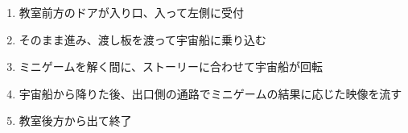 \documentclass[uplatex,dvipdfmx]{jsarticle}
\begin{document}
\begin{enumerate}
    \item 教室前方のドアが入り口、入って左側に受付
    \item そのまま進み、渡し板を渡って宇宙船に乗り込む
    \item ミニゲームを解く間に、ストーリーに合わせて宇宙船が回転
    \item 宇宙船から降りた後、出口側の通路でミニゲームの結果に応じた映像を流す
    \item 教室後方から出て終了
\end{enumerate}
\end{document}
